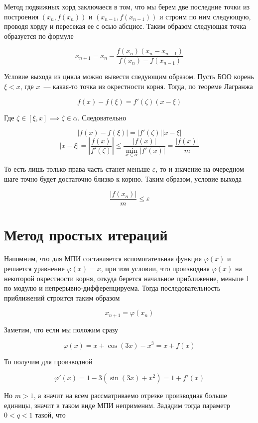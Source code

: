 \documentclass[11pt,a4paper,oneside]{article}
\begin{document}
Метод подвижных хорд заключаеся в том, что мы берем две последние точки из построения $(x_n, f(x_n))$ и $(x_{n - 1}, f(x_{n - 1}))$ и строим по ним следующую, проводя хорду и пересекая ее с осью абсцисс. Таким образом следующая точка образуется по формуле

$$ x_{n + 1} = x_n - \frac{f(x_n) (x_n - x_{n - 1})}{f(x_n) - f(x_{n - 1})} $$

Условие выхода из цикла можно вывести следующим образом. Пусть БОО корень $\xi < x$, где $x$~--- какая-то точка из окрестности корня. Тогда, по теореме Лагранжа

$$ f(x) - f(\xi) = f'(\zeta) (x - \xi) $$

Где $\zeta \in [\xi, x] \implies \zeta \in \alpha$. Следовательно

$$ \left| f(x) - f(\xi) \right| = \left| f'(\zeta) \right| \left| x - \xi \right| $$
$$ \left| x - \xi \right| = \left| \frac{f(x)}{f'(\zeta)} \right|
	\le \frac{\left| f(x) \right|}{\min_{x \in \alpha}|f'(x)|} = \frac{\left|f(x)\right|}{m} $$
	
То есть лишь только права часть станет меньше $\varepsilon$, то и значение на очередном шаге точно будет достаточно близко к корню. Таким образом, условие выхода

$$ \frac{\left|f(x_n)\right|}{m} \le \varepsilon $$

\section{Метод простых итераций}

Напомним, что для МПИ составляется вспомогательная функция $\varphi(x)$ и решается уравнение $\varphi(x) = x$, при том условии, что производная $\varphi(x)$ на некоторой окрестности корня, откуда берется начальное приближение, меньше 1 по модулю и непрерывно-дифференцируема. Тогда последовательность приближений строится таким образом

$$ x_{n + 1} = \varphi(x_n) $$

Заметим, что если мы положим сразу

$$ \varphi(x) = x + \cos(3x) - x^3 = x + f(x) $$

То получим для производной

$$ \varphi'(x) = 1 - 3 (\sin(3x) + x^2) = 1 + f'(x) $$

Но $m > 1$, а значит на всем рассматриваемо отрезке производная больше единицы, значит в таком виде МПИ неприменим. Зададим тогда параметр $0 < q < 1$ такой, что
\end{document}
